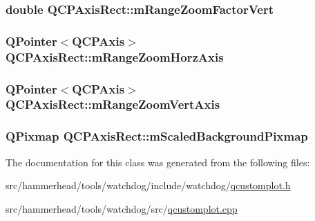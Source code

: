 \subsubsection[{\texorpdfstring{m\+Range\+Zoom\+Factor\+Vert}{mRangeZoomFactorVert}}]{\setlength{\rightskip}{0pt plus 5cm}double Q\+C\+P\+Axis\+Rect\+::m\+Range\+Zoom\+Factor\+Vert\hspace{0.3cm}{\ttfamily [protected]}}\hypertarget{classQCPAxisRect_a32f063629581d5bf82b12769940b34ad}{}\label{classQCPAxisRect_a32f063629581d5bf82b12769940b34ad}
\subsubsection[{\texorpdfstring{m\+Range\+Zoom\+Horz\+Axis}{mRangeZoomHorzAxis}}]{\setlength{\rightskip}{0pt plus 5cm}Q\+Pointer$<${\bf Q\+C\+P\+Axis}$>$ Q\+C\+P\+Axis\+Rect\+::m\+Range\+Zoom\+Horz\+Axis\hspace{0.3cm}{\ttfamily [protected]}}\hypertarget{classQCPAxisRect_ae22f882bab20518559f3fbb84243d0ab}{}\label{classQCPAxisRect_ae22f882bab20518559f3fbb84243d0ab}
\subsubsection[{\texorpdfstring{m\+Range\+Zoom\+Vert\+Axis}{mRangeZoomVertAxis}}]{\setlength{\rightskip}{0pt plus 5cm}Q\+Pointer$<${\bf Q\+C\+P\+Axis}$>$ Q\+C\+P\+Axis\+Rect\+::m\+Range\+Zoom\+Vert\+Axis\hspace{0.3cm}{\ttfamily [protected]}}\hypertarget{classQCPAxisRect_a8b9acd16a203a9692bd35a9465f54bc1}{}\label{classQCPAxisRect_a8b9acd16a203a9692bd35a9465f54bc1}
\subsubsection[{\texorpdfstring{m\+Scaled\+Background\+Pixmap}{mScaledBackgroundPixmap}}]{\setlength{\rightskip}{0pt plus 5cm}Q\+Pixmap Q\+C\+P\+Axis\+Rect\+::m\+Scaled\+Background\+Pixmap\hspace{0.3cm}{\ttfamily [protected]}}\hypertarget{classQCPAxisRect_aa74b9415598d59b49290e41e42d7ee27}{}\label{classQCPAxisRect_aa74b9415598d59b49290e41e42d7ee27}


The documentation for this class was generated from the following files\+:\begin{DoxyCompactItemize}
\item 
src/hammerhead/tools/watchdog/include/watchdog/\hyperlink{qcustomplot_8h}{qcustomplot.\+h}\item 
src/hammerhead/tools/watchdog/src/\hyperlink{qcustomplot_8cpp}{qcustomplot.\+cpp}\end{DoxyCompactItemize}
